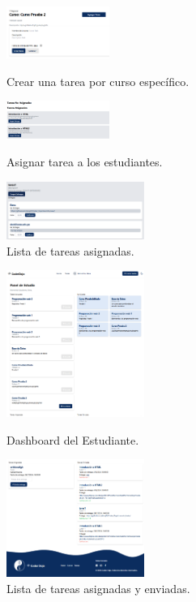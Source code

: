 \documentclass{article}
\begin{document}
\begin{figure}[H]
	\centering
	\includegraphics[width=0.3\textwidth,keepaspectratio]{img/teacherTask.png}
	\caption{Crear una tarea por curso específico.}
	\centering
	\includegraphics[width=0.3\textwidth,keepaspectratio]{img/teacherAssign.png}
	\caption{Asignar tarea a los estudiantes.}
	\centering
	\includegraphics[width=0.4\textwidth,keepaspectratio]{img/teacherListAssign.png}
	\caption{Lista de tareas asignadas.}
\end{figure}

\begin{figure}[H]
	\centering
	\includegraphics[width=0.4\textwidth,keepaspectratio]{img/studentDashBoard.png}
	\caption{Dashboard del Estudiante.}
	\centering
	\includegraphics[width=0.4\textwidth,keepaspectratio]{img/studentTasks.png}
	\caption{Lista de tareas asignadas y enviadas.}
\end{figure}
\pagebreak
\end{document}
